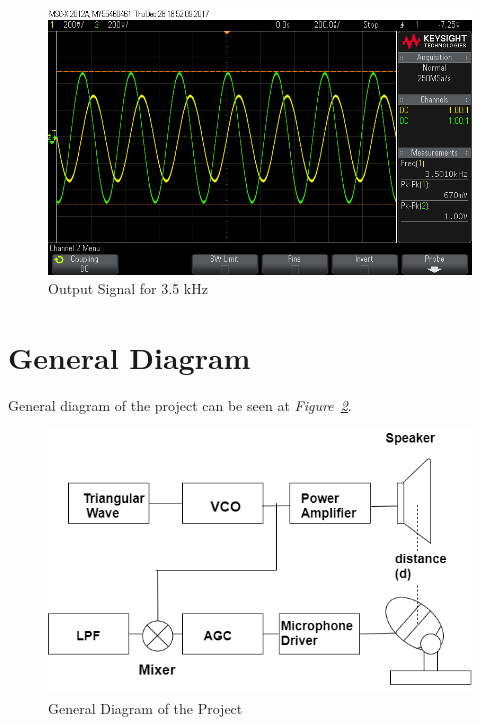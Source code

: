 \documentclass[paper]{IEEEtran}
\begin{document}
\begin{figure}[h!]
	\setlength{\unitlength}{\textwidth}
	\center 
	\includegraphics[width=0.45\unitlength]{filt_osc5.png}
	\caption{\label{fig:lpfvo2}Output Signal for 3.5 kHz}
\end{figure} 
		

		
\section{General Diagram}

	General diagram of the project can be seen at \textit{Figure~\ref{fig:diagram}}.

\begin{figure}[h!]
\setlength{\unitlength}{\textwidth}
\center 
\includegraphics[width=0.5\unitlength]{diagram3.png}
\caption{\label{fig:diagram}General Diagram of the Project }
\end{figure}	
\end{document}
